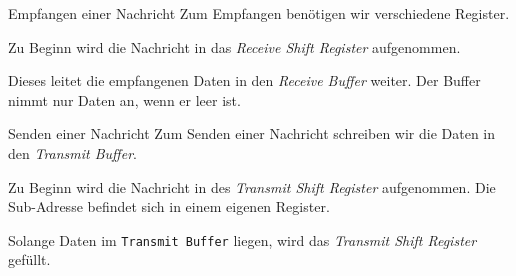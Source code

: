 \begin{bonus}{Empfangen einer Nachricht}
    Zum Empfangen benötigen wir verschiedene Register.

    Zu Beginn wird die Nachricht in das \emph{Receive Shift Register} aufgenommen.

    Dieses leitet die empfangenen Daten in den \emph{Receive Buffer} weiter.
    Der Buffer nimmt nur Daten an, wenn er leer ist.
\end{bonus}

\begin{bonus}{Senden einer Nachricht}
    Zum Senden einer Nachricht schreiben wir die Daten in  den \emph{Transmit Buffer}.

    Zu Beginn wird die Nachricht in des \emph{Transmit Shift Register} aufgenommen.
    Die Sub-Adresse befindet sich in einem eigenen Register.

    Solange Daten im \texttt{Transmit Buffer} liegen, wird das \emph{Transmit Shift Register} gefüllt.
\end{bonus}